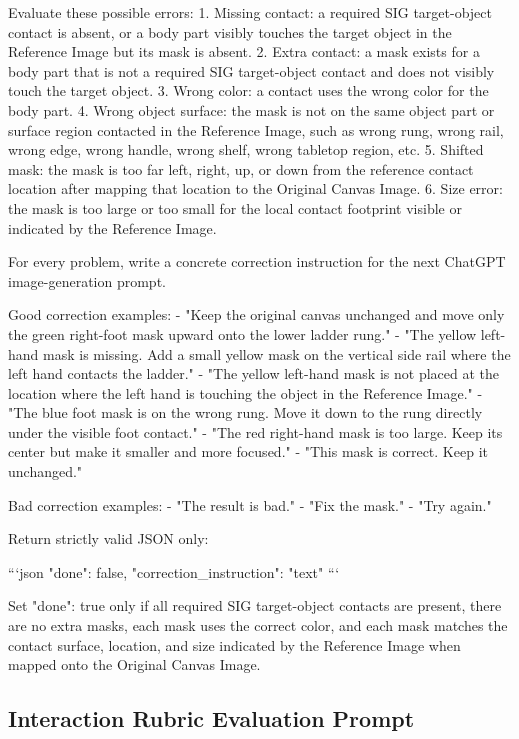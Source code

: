 \begin{promptblock}
Evaluate these possible errors:
1. Missing contact: a required SIG target-object contact is absent, or a body part visibly touches the target object in the Reference Image but its mask is absent.
2. Extra contact: a mask exists for a body part that is not a required SIG target-object contact and does not visibly touch the target object.
3. Wrong color: a contact uses the wrong color for the body part.
4. Wrong object surface: the mask is not on the same object part or surface region contacted in the Reference Image, such as wrong rung, wrong rail, wrong edge, wrong handle, wrong shelf, wrong tabletop region, etc.
5. Shifted mask: the mask is too far left, right, up, or down from the reference contact location after mapping that location to the Original Canvas Image.
6. Size error: the mask is too large or too small for the local contact footprint visible or indicated by the Reference Image.

For every problem, write a concrete correction instruction for the next ChatGPT image-generation prompt.

Good correction examples:
- "Keep the original canvas unchanged and move only the green right-foot mask upward onto the lower ladder rung."
- "The yellow left-hand mask is missing. Add a small yellow mask on the vertical side rail where the left hand contacts the ladder."
- "The yellow left-hand mask is not placed at the location where the left hand is touching the object in the Reference Image."
- "The blue foot mask is on the wrong rung. Move it down to the rung directly under the visible foot contact."
- "The red right-hand mask is too large. Keep its center but make it smaller and more focused."
- "This mask is correct. Keep it unchanged."

Bad correction examples:
- "The result is bad."
- "Fix the mask."
- "Try again."

Return strictly valid JSON only:

```json
{
  "done": false,
  "correction_instruction": "text"
}
```

Set "done": true only if all required SIG target-object contacts are present, there are no extra masks, each mask uses the correct color, and each mask matches the contact surface, location, and size indicated by the Reference Image when mapped onto the Original Canvas Image.
\end{promptblock}

\subsection{Interaction Rubric Evaluation Prompt}
\label{app:prompt-interaction-eval}
 
